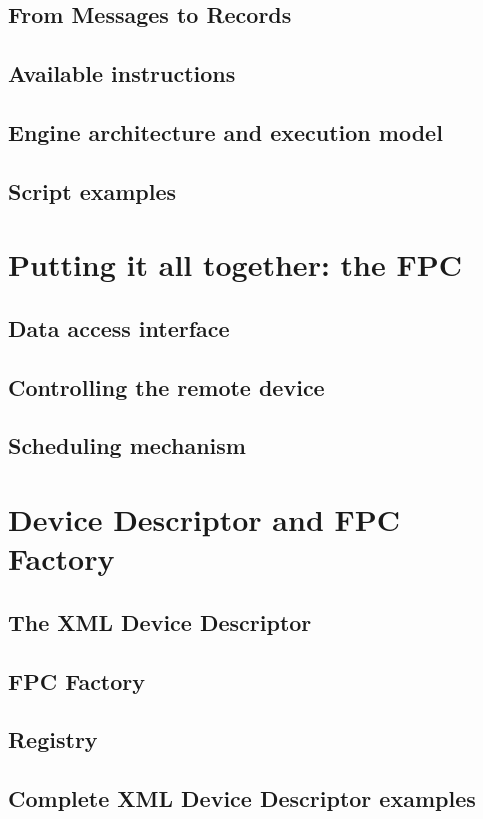 \subsection{From Messages to Records}

\subsection{Available instructions}

\subsection{Engine architecture and execution model}

\subsection{Script examples}


\section{Putting it all together: the FPC}

\subsection{Data access interface}

\subsection{Controlling the remote device}

\subsection{Scheduling mechanism}


\section{Device Descriptor and FPC Factory}

\subsection{The XML Device Descriptor}

\subsection{FPC Factory}

\subsection{Registry}

\subsection{Complete XML Device Descriptor examples}
